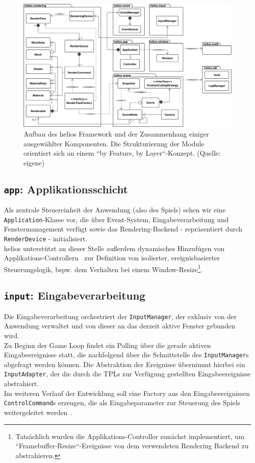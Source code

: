 \begin{figure}[t]
    \centering
    \includegraphics[width=1\textwidth]{img/package_diagram.svg}%
    \caption{Aufbau des helios Framework und der Zusammenhang einiger ausgewählter Komponenten. Die Strukturierung der Module orientiert sich an einem ``by Feature, by Layer``-Konzept. (Quelle: eigene)}
    \label{fig:package_diagram}
\end{figure}


\subsection*{\texttt{app}: Applikationsschicht}
Als zentrale Steuereinheit der Anwendung (also des Spiels) sehen wir eine \texttt{Application}-Klasse vor, die über Event-System, Eingabeverarbeitung und Fenstermanagement verfügt sowie das Rendering-Backend - repräsentiert durch \texttt{RenderDevice} - initialisiert.\\
helios unterstützt an dieser Stelle außerdem dynamisches Hinzufügen von Applikations-Controllern~\cite[379]{Fow03} zur Definition von isolierter, ereignisbasierter Steuerungslogik, bspw. dem Verhalten bei einem Window-Resize\footnote{
Tatsächlich wurden die Applikations-Controller zunächst implementiert, um ``Framebuffer-Resize``-Ereignisse von dem verwendeten Rendering Backend zu abstrahieren.
}.

\subsection*{\texttt{input}: Eingabeverarbeitung}
Die Eingabeverarbeitung orchestriert der \texttt{InputManager}, der exklusiv von der Anwendung verwaltet und von dieser an das derzeit aktive Fenster gebunden wird.\\
Zu Beginn der Game Loop findet ein Polling über die gerade aktiven Eingabeereignisse statt, die nachfolgend über die Schnittstelle des \texttt{InputManager}s abgefragt werden können.
Die Abstraktion der Ereignisse übernimmt hierbei ein \texttt{InputAdapter}, der die durch die TPLs zur Verfügung gestellten Eingabeereignisse abstrahiert.\\
Im weiteren Verlauf der Entwicklung soll eine Factory aus den Eingabeereignissen \texttt{ControlCommand}s erzeugen, die als Eingabeparameter zur Steuerung des Spiels weitergeleitet werden~\cite[21 ff.]{Nys14}.

